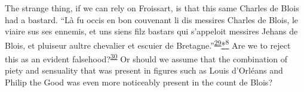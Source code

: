 The strange thing, if we can rely on Froissart, is that this same
Charles de Blois had a bastard. ``Là fu occis en bon couvenant li dis
messires Charles de Blois, le viaire sus ses ennemis, et uns siens filz
bastars qui s'appeloit messires Jehans de Blois, et pluiseur aultre
chevalier et escuier de
Bretagne.''\textsuperscript{\protect\hypertarget{14_Chapter_Seven__THE_PIOUS_PERSONA.xhtmlux5cux23id_966}{\protect\hyperlink{23_NOTES.xhtmlux5cux23id_967}{29}}}\protect\hypertarget{14_Chapter_Seven__THE_PIOUS_PERSONA.xhtmlux5cux23id_2555}{\protect\hyperlink{23_NOTES.xhtmlux5cux23id_2556}{*\textsuperscript{8}}}
Are we to reject this as an evident
falsehood?\textsuperscript{\protect\hypertarget{14_Chapter_Seven__THE_PIOUS_PERSONA.xhtmlux5cux23id_964}{\protect\hyperlink{23_NOTES.xhtmlux5cux23id_965}{30}}}
Or should we assume that the combination of piety and sensuality that
was present in figures such as Louis d'Orléans and Philip the Good was
even more noticeably present in the count de Blois?

